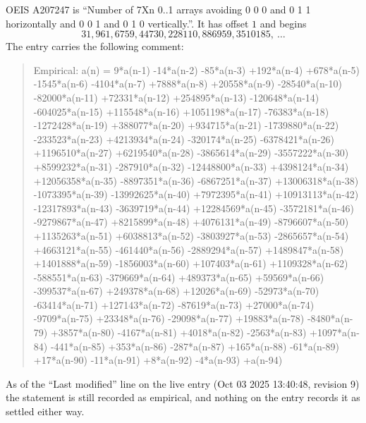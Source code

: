 \documentclass[11pt,a4paper]{article}
\theoremstyle{plain}
\theoremstyle{definition}
\begin{document}
OEIS A207247 is ``Number of 7Xn 0..1 arrays avoiding 0 0 0 and 0 1 1 horizontally and 0 0 1 and 0 1 0 vertically.''. It has offset
$1$ and begins
\[
31, 961, 6759, 44730, 228110, 886959, 3510185,\ \dots
\]
The entry carries the following comment:
\begin{quote}\small
Empirical: a(n) = 9*a(n-1) -14*a(n-2) -85*a(n-3) +192*a(n-4) +678*a(n-5) -1545*a(n-6) -4104*a(n-7) +7888*a(n-8) +20558*a(n-9) -28540*a(n-10) -82000*a(n-11) +72331*a(n-12) +254895*a(n-13) -120648*a(n-14) -604025*a(n-15) +115548*a(n-16) +1051198*a(n-17) -76383*a(n-18) -1272428*a(n-19) +388077*a(n-20) +934715*a(n-21) -1739880*a(n-22) -233523*a(n-23) +4213934*a(n-24) -320174*a(n-25) -6378421*a(n-26) +1196510*a(n-27) +6219540*a(n-28) -3865614*a(n-29) -3557222*a(n-30) +8599232*a(n-31) -287910*a(n-32) -12448800*a(n-33) +4398124*a(n-34) +12056358*a(n-35) -8897351*a(n-36) -6867251*a(n-37) +13006318*a(n-38) -1073395*a(n-39) -13992625*a(n-40) +7972395*a(n-41) +10913113*a(n-42) -12317893*a(n-43) -3639719*a(n-44) +12284569*a(n-45) -3572181*a(n-46) -9279867*a(n-47) +8215899*a(n-48) +4076131*a(n-49) -8796607*a(n-50) +1135263*a(n-51) +6038813*a(n-52) -3803927*a(n-53) -2865657*a(n-54) +4663121*a(n-55) -461440*a(n-56) -2889294*a(n-57) +1489847*a(n-58) +1401888*a(n-59) -1856003*a(n-60) +107403*a(n-61) +1109328*a(n-62) -588551*a(n-63) -379669*a(n-64) +489373*a(n-65) +59569*a(n-66) -399537*a(n-67) +249378*a(n-68) +12026*a(n-69) -52973*a(n-70) -63414*a(n-71) +127143*a(n-72) -87619*a(n-73) +27000*a(n-74) -9709*a(n-75) +23348*a(n-76) -29098*a(n-77) +19883*a(n-78) -8480*a(n-79) +3857*a(n-80) -4167*a(n-81) +4018*a(n-82) -2563*a(n-83) +1097*a(n-84) -441*a(n-85) +353*a(n-86) -287*a(n-87) +165*a(n-88) -61*a(n-89) +17*a(n-90) -11*a(n-91) +8*a(n-92) -4*a(n-93) +a(n-94)
\end{quote}
As of the ``Last modified'' line on the live entry (Oct 03 2025 13:40:48, revision
9) the statement is still recorded as empirical, and nothing on the entry
records it as settled either way.
\end{document}
